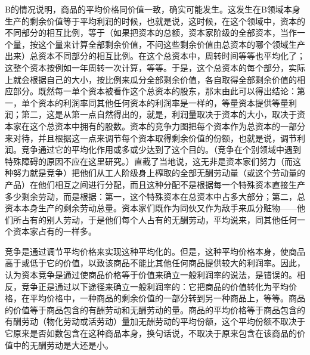 B的情况说明，商品的平均价格同价值一致，确实可能发生。这发生在B领域本身生产的剩余价值等于平均利润的时候，也就是说，这时候，在这个领域中，资本的不同部分的相互比例，等于（如果把资本的总额，资本家阶级的全部资本，当作一个量，按这个量来计算全部剩余价值，不问这些剩余价值由总资本的哪个领域生产出来）总资本不同部分的相互比例。在这个总资本中，周转时间等等也平均化了；这整个资本按例如一年周转一次计算，等等。于是，这个总资本的每个部分，实际上就会根据自己的大小，按比例来瓜分全部剩余价值，各自取得全部剩余价值的相应部分。既然每一单个资本被看作这个总资本的股东，那末由此可以得出结论：第一，单个资本的利润率同其他任何资本的利润率是一样的，等量资本提供等量利润；第二，这是从第一点自然得出的，就是，利润量取决于资本的大小，取决于资本家在这个总资本中拥有的股数。资本的竞争力图把每个资本作为总资本的一部分来对待，并且根据这一点来调节每个资本取得剩余价值的份额，也就是说，调节利润。竞争通过它的平均化作用或多或少达到了这个目的。（竞争在个别领域中遇到特殊障碍的原因不应在这里研究。）直截了当地说，这无非是资本家们努力（而这种努力就是竞争）把他们从工人阶级身上榨取的全部无酬劳动量（或这个劳动量的产品）在他们相互之间进行分配，而且这种分配不是根据每一个特殊资本直接生产多少剩余劳动，而是根据：第一，这个特殊资本在总资本中占多大部分；第二，总资本本身生产的剩余劳动总量。资本家们既作为同伙又作为敌手来瓜分赃物——他们所占有的别人劳动，于是他们每个人占有的无酬劳动，平均说来，同其他任何一个资本家占有的一样多。

竞争是通过调节平均价格来实现这种平均化的。但是，这种平均价格本身，使商品高于或低于它的价值，以致该商品不能比其他任何商品提供较大的利润率。因此，认为资本竞争是通过使商品价格等于价值来确立一般利润率的说法，是错误的。相反，竞争正是通过以下途径来确立一般利润率的：它把商品的价值转化为平均价格，在平均价格中，一种商品的剩余价值的一部分转到另一种商品上，等等。商品的价值等于商品包含的有酬劳动和无酬劳动的量。商品的平均价格等于商品包含的有酬劳动（物化劳动或活劳动）量加无酬劳动的平均份额，这个平均份额不取决于它原来是否如数包含在这种商品本身，换句话说，不取决于原来包含在该商品的价值中的无酬劳动是大还是小。


